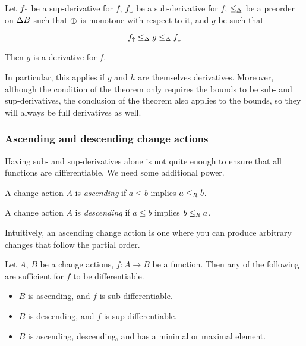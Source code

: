 \begin{thm}
  \label{thm:sandwich}
  Let $f_\uparrow$ be a sup-derivative for $f$, $f_\downarrow$ be a sub-derivative for $f$, $\leq_\Delta$ be a preorder on $\Delta B$ such that $\oplus$ is monotone with
  respect to it, and $g$ be such that

  $$f_\uparrow \leq_\Delta g \leq_\Delta f_\downarrow$$

  Then $g$ is a derivative for $f$.
\end{thm}

In particular, this applies if $g$ and $h$ are themselves derivatives. Moreover,
although the condition of the theorem only requires the bounds to be sub- and
sup-derivatives, the conclusion of the theorem also applies to the bounds, so
they will always be full derivatives as well.

\subsubsection{Ascending and descending change actions}

Having sub- and sup-derivatives alone is not quite enough to ensure that all
functions are differentiable. We need some additional power.

\begin{defn}
  A change action $A$ is \textit{ascending} if $a \leq b$ implies $a
  \leq_R b$.

  A change action $A$ is \textit{descending} if $a \leq b$ implies $b
  \leq_R a$.
\end{defn}

Intuitively, an ascending change action is one where you can produce
arbitrary changes that follow the partial order.

\begin{thm}
  Let $A$, $B$ be a change actions, $f: A \rightarrow B$ be a function. Then
  any of the following are sufficient for $f$ to be differentiable.
  \begin{itemize}
    \item $B$ is ascending, and $f$ is sub-differentiable.
    \item $B$ is descending, and $f$ is sup-differentiable.
    \item $B$ is ascending, descending, and has a minimal or maximal element.
  \end{itemize}
\end{thm}

